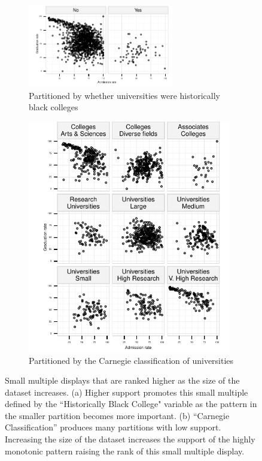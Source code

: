 \begin{figure}[t]
 \centering 
 	 \begin{subfigure}{2.5in}
 \centering 
		\includegraphics[width=2.5in]{images/Historically_Black_College.pdf}
		  \caption{Partitioned by whether universities were historically black colleges}
		 \label{fig:support1}
 	\end{subfigure}
 	 \begin{subfigure}{3.5in}
 \centering 
        \vspace{0.5cm}
		\includegraphics[width=3.5in]{images/Carnegie_Classification.pdf}
		  \caption{Partitioned by the Carnegie classification of universities}
		 \label{fig:support2}
 	\end{subfigure}
	\caption{Small multiple displays that are ranked higher as the size of the dataset increases. (a) Higher support promotes this small multiple defined by the ``Historically Black College" variable as the pattern in the smaller partition becomes more important. (b) ``Carnegie Classification'' produces many partitions with low support. Increasing the size of the dataset increases the support of the highly monotonic pattern raising the rank of this small multiple display.}
\end{figure}



